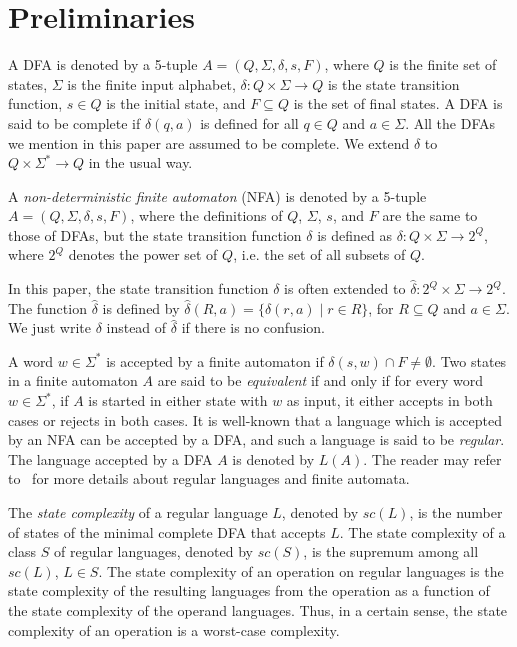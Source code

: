 \documentclass[10pt]{article}
\begin{document}
\section{Preliminaries}
A DFA is denoted by a 5-tuple $A = (Q,
\Sigma, \delta, s, F)$, where $Q$ is the finite set of states, $\Sigma$ is the finite input alphabet, $\delta: Q \times \Sigma \rightarrow Q$ is the state transition function, $s \in Q$ is the initial state, and $F \subseteq Q$ is the set of final states.
A DFA is said to be complete if $\delta(q,a)$ is defined for all $q \in Q$ and $a \in \Sigma$.
All the DFAs we mention in this paper are assumed to be complete.
We extend $\delta$ to $Q \times \Sigma^* \rightarrow Q$ in the usual way.

A {\it non-deterministic finite automaton} (NFA) is denoted by a 5-tuple $A = (Q,
\Sigma, \delta, s, F)$, where the definitions of $Q$, $\Sigma$, $s$, and $F$ are the same to those of DFAs, but the state transition function $\delta$ is defined as $\delta: Q \times \Sigma \to 2^Q$, where $2^Q$ denotes the power set of $Q$, i.e. the set of all subsets of $Q$.

In this paper, the state transition function $\delta$ is often extended to $\hat{\delta} : 2^Q \times \Sigma \rightarrow 2^Q$. The function $\hat{\delta}$ is defined by $\hat{\delta}(R,a) = \{\delta(r,a) \mid r \in R\}$, for $R \subseteq Q$ and $a \in \Sigma$.
We just write $\delta$ instead of $\hat{\delta}$ if there is no confusion.

A word $w \in \Sigma^*$ is accepted by a finite automaton if $\delta(s,w) \cap F
\neq \emptyset$.
Two states in a finite automaton $A$ are said to be {\it equivalent} if and only if for every word $w \in \Sigma^*$, if $A$ is started in either state with $w$ as input, it either accepts in both cases or rejects in both cases.
It is well-known that a language which is accepted by
an NFA can be accepted by a DFA, and such a language is said to be {\it regular}.
The language accepted by a DFA $A$ is denoted by $L(A)$.
The reader may refer to~\cite{HoMoUl01,Yu97} for more
details about regular languages and finite automata.

The {\it state complexity} of a regular language $L$, denoted by
$sc(L)$, is the number of states of the minimal complete DFA that
accepts $L$. The state complexity of a class $S$ of regular
languages, denoted by $sc(S)$, is the supremum among all $sc(L)$, $L
\in S$. The state complexity of an operation on regular languages is
the state complexity of the resulting languages from the operation as a function of the state complexity of the operand languages.
Thus, in a certain sense, the state complexity of an operation is a worst-case complexity.
\end{document}
